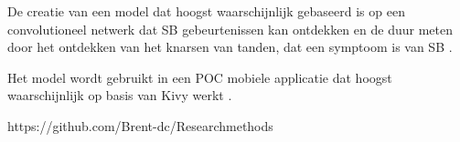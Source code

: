 \documentclass{hogent-article}
\begin{document}
De creatie van een model dat hoogst waarschijnlijk gebaseerd is op een convolutioneel netwerk dat SB gebeurtenissen kan ontdekken en de duur meten door het ontdekken van het knarsen van tanden, dat een symptoom is van SB .

Het model wordt gebruikt in een POC mobiele applicatie dat hoogst waarschijnlijk op basis van Kivy werkt .










\printbibliography
\noindent\makebox[\linewidth]{\rule{\paperwidth / 3}{0.4pt}}
https://github.com/Brent-dc/Researchmethods
\end{document}
